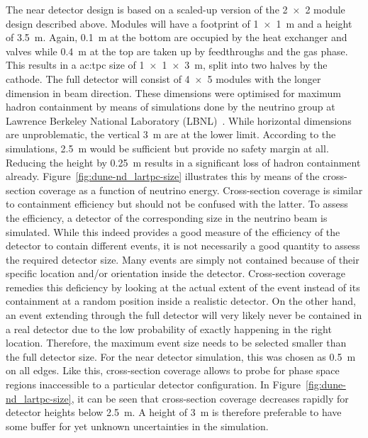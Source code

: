 The \AC{} near detector design is based on a scaled-up version of the \num{2 x 2} module design described above.
Modules will have a footprint of \SI{1 x 1}{\metre} and a height of \SI{3.5}{\metre}.
Again, \SI{0.1}{\metre} at the bottom are occupied by the heat exchanger and valves while \SI{0.4}{\metre} at the top are taken up by feedthroughs and the gas phase.
This results in a \gls{ac:tpc} size of \SI{1 x 1 x 3}{\metre}, split into two halves by the cathode.
The full detector will consist of \num{4 x 5} modules with the longer dimension in beam direction.
These dimensions were optimised for maximum hadron containment by means of simulations done by the neutrino group at Lawrence Berkeley National Laboratory (LBNL)~\cite{lartpcSizeChris}.
While horizontal dimensions are unproblematic, the vertical \SI{3}{\metre} are at the lower limit.
According to the simulations, \SI{2.5}{\metre} would be sufficient but provide no safety margin at all.
Reducing the height by \SI{0.25}{\metre} results in a significant loss of hadron containment already.
Figure~\ref{fig:dune-nd_lartpc-size} illustrates this by means of the cross-section coverage as a function of neutrino energy.
Cross-section coverage is similar to containment efficiency but should not be confused with the latter.
To assess the efficiency, a detector of the corresponding size in the neutrino beam is simulated.
While this indeed provides a good measure of the efficiency of the detector to contain different events, it is not necessarily a good quantity to assess the required detector size.
Many events are simply not contained because of their specific location and/or orientation inside the detector.
Cross-section coverage remedies this deficiency by looking at the actual extent of the event instead of its containment at a random position inside a realistic detector.
On the other hand, an event extending through the full detector will very likely never be contained in a real detector due to the low probability of exactly happening in the right location.
Therefore, the maximum event size needs to be selected smaller than the full detector size.
For the near detector simulation, this was chosen as \SI{0.5}{\metre} on all edges.
Like this, cross-section coverage allows to probe for phase space regions inaccessible to a particular detector configuration.
In Figure~\ref{fig:dune-nd_lartpc-size}, it can be seen that cross-section coverage decreases rapidly for detector heights below \SI{2.5}{\metre}.
A height of \SI{3}{\metre} is therefore preferable to have some buffer for yet unknown uncertainties in the simulation.

